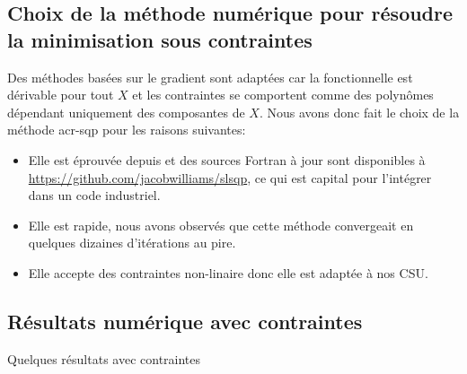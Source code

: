 \subsection{Choix de la méthode numérique pour résoudre la minimisation sous contraintes}

  Des méthodes basées sur le gradient sont adaptées car la fonctionnelle est dérivable pour tout \(X\) et les contraintes se comportent comme des polynômes dépendant uniquement des composantes de \(X\). Nous avons donc fait le choix de la méthode \gls{acr-sqp} pour les raisons suivantes:
 
  \begin{itemize}
    \item Elle est éprouvée depuis \cite{kraft_software_1988} et des sources Fortran à jour sont disponibles à \url{https://github.com/jacobwilliams/slsqp}, ce qui est capital pour l'intégrer dans un code industriel.
    \item Elle est rapide, nous avons observés que cette méthode convergeait en quelques dizaines d'itérations au pire.
    \item Elle accepte des contraintes non-linaire donc elle est adaptée à nos CSU.
  \end{itemize}

\subsection{Résultats numérique avec contraintes}

  \begin{TODO}
    Quelques résultats avec contraintes
  \end{TODO}